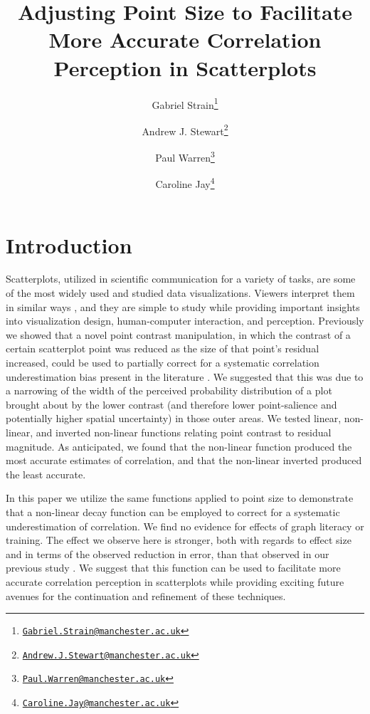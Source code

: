 \documentclass{vgtc}                          %
\title{Adjusting Point Size to Facilitate More Accurate Correlation Perception in Scatterplots}
\author{Gabriel Strain\thanks{\href{mailto:Gabriel.Strain@manchester.ac.uk}{\nolinkurl{Gabriel.Strain@manchester.ac.uk}}} %
\and Andrew J. Stewart\thanks{\href{mailto:Andrew.J.Stewart@manchester.ac.uk}{\nolinkurl{Andrew.J.Stewart@manchester.ac.uk}}} %
\and Paul Warren\thanks{\href{mailto:Paul.Warren@manchester.ac.uk}{\nolinkurl{Paul.Warren@manchester.ac.uk}}} %
\and Caroline Jay\thanks{\href{mailto:Caroline.Jay@manchester.ac.uk}{\nolinkurl{Caroline.Jay@manchester.ac.uk}}}} %
\affiliation{\scriptsize The University of Manchester}
\begin{document}

\firstsection{}

\maketitle

\hypertarget{introduction}{%
\section{Introduction}\label{introduction}}

Scatterplots, utilized in scientific communication for a variety of tasks,
are some of the most widely used and studied data visualizations. Viewers
interpret them in similar ways \cite{kay_heer_2015}, and they are simple
to study while providing important insights into visualization
design, human-computer interaction, and perception. Previously \cite{strain_2023}
we showed that a novel point contrast manipulation, in which the contrast of a certain
scatterplot point was reduced as the size of that point's residual increased, could be
used to partially correct for a systematic correlation underestimation bias present in the
literature \cite{strahan_1978, bobko_1979, cleveland_1982, lane_1985, lauer_1989, 
collyer_1990, meyer_1992}. We suggested that this was due to a narrowing of the width
of the perceived probability distribution of a plot brought
about by the lower contrast (and therefore lower point-salience and potentially higher spatial uncertainty)
in those outer areas. We tested linear, non-linear, and inverted non-linear functions relating point contrast to
residual magnitude. As anticipated, we found that the non-linear function produced
the most accurate estimates of correlation, and that the non-linear inverted produced
the least accurate.

In this paper we utilize the same functions applied to point size to demonstrate that
a non-linear decay function can be employed to correct for a systematic underestimation of correlation.
We find no evidence for effects of graph literacy or training.
The effect we observe here is stronger, both with regards to effect size
and in terms of the observed reduction in error, than that
observed in our previous study \cite{strain_2023}. We suggest that this
function can be used to facilitate more accurate correlation
perception in scatterplots while providing exciting future avenues for the continuation
and refinement of these techniques.
\end{document}
